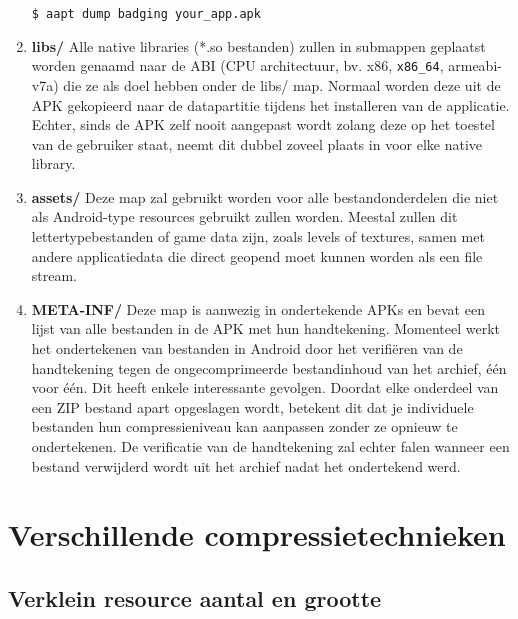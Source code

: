 \begin{enumerate}
\begin{lstlisting}[backgroundcolor = \color{lightgray}, xleftmargin = 2cm,
framexleftmargin = 1em]
$ aapt dump badging your_app.apk
\end{lstlisting}
\item \textbf{libs/}\newline
Alle native libraries (*.so bestanden) zullen in submappen geplaatst worden genaamd naar de ABI (CPU architectuur, bv. x86, \texttt{x86\_64}, armeabi-v7a) die ze als doel hebben onder de libs/ map. Normaal worden deze uit de APK gekopieerd naar de datapartitie tijdens het installeren van de applicatie. Echter, sinds de APK zelf nooit aangepast wordt zolang deze op het toestel van de gebruiker staat, neemt dit dubbel zoveel plaats in voor elke native library. 
\item \textbf{assets/}\newline
Deze map zal gebruikt worden voor alle bestandonderdelen die niet als Android-type resources gebruikt zullen worden. Meestal zullen dit lettertypebestanden of game data zijn, zoals levels of textures, samen met andere applicatiedata die direct geopend moet kunnen worden als een file stream.
\item \textbf{META-INF/}\newline
Deze map is aanwezig in ondertekende APKs en bevat een lijst van alle bestanden in de APK met hun handtekening. Momenteel werkt het ondertekenen van bestanden in Android door het verifiëren van de handtekening tegen de ongecomprimeerde bestandinhoud van het archief, één voor één. Dit heeft enkele interessante gevolgen. Doordat elke onderdeel van een ZIP bestand apart opgeslagen wordt, betekent dit dat je individuele bestanden hun compressieniveau kan aanpassen zonder ze opnieuw te ondertekenen. De verificatie van de handtekening zal echter falen wanneer een bestand verwijderd wordt uit het archief nadat het ondertekend werd. 
\end{enumerate}

\section{Verschillende compressietechnieken} \cite{googlereduceapksize}
\label{sec:compressietechnieken}

\subsection{Verklein resource aantal en grootte}
\label{sec:reduceresources}


